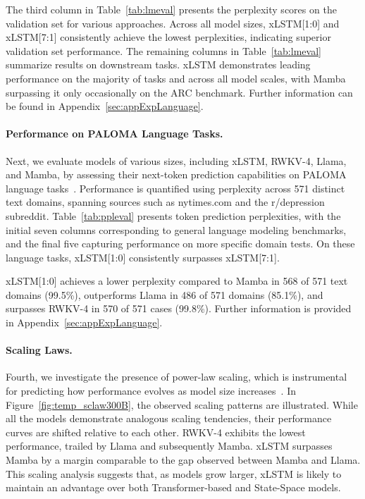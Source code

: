 The third column in Table~\ref{tab:lmeval} presents the perplexity scores on the validation set for various approaches. Across all model sizes, xLSTM[1:0] and xLSTM[7:1] consistently achieve the lowest perplexities, indicating superior validation set performance. The remaining columns in Table~\ref{tab:lmeval} summarize results on downstream tasks. xLSTM demonstrates leading performance on the majority of tasks and across all model scales, with Mamba surpassing it only occasionally on the ARC benchmark. Further information can be found in Appendix~\ref{sec:appExpLanguage}.

\paragraph{Performance on PALOMA Language Tasks.} Next, we evaluate models of various sizes, including xLSTM, RWKV-4, Llama, and Mamba, by assessing their next-token prediction capabilities on PALOMA language tasks~\citep{Magnusson:23arxivshort}. Performance is quantified using perplexity across 571 distinct text domains, spanning sources such as nytimes.com and the r/depression subreddit. Table~\ref{tab:ppleval} presents token prediction perplexities, with the initial seven columns corresponding to general language modeling benchmarks, and the final five capturing performance on more specific domain tests. On these language tasks, xLSTM[1:0] consistently surpasses xLSTM[7:1].

xLSTM[1:0] achieves a lower perplexity compared to Mamba in 568 of 571 text domains (99.5\%), outperforms Llama in 486 of 571 domains (85.1\%), and surpasses RWKV-4 in 570 of 571 cases (99.8\%). Further information is provided in Appendix~\ref{sec:appExpLanguage}.

\paragraph{Scaling Laws.} Fourth, we investigate the presence of power-law scaling, which is instrumental for predicting how performance evolves as model size increases~\citep{Kaplan:20,Brown:20short}. In Figure~\ref{fig:temp_sclaw300B}, the observed scaling patterns are illustrated. While all the models demonstrate analogous scaling tendencies, their performance curves are shifted relative to each other. RWKV-4 exhibits the lowest performance, trailed by Llama and subsequently Mamba. xLSTM surpasses Mamba by a margin comparable to the gap observed between Mamba and Llama. This scaling analysis suggests that, as models grow larger, xLSTM is likely to maintain an advantage over both Transformer-based and State-Space models.

